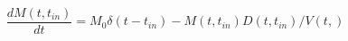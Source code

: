 \begin{equation}
\frac{d M(t,t_{in})}{dt} = M_0 \delta(t-t_{in}) - M(t,t_{in})D(t,t_{in})/V(t,)
\end{equation}